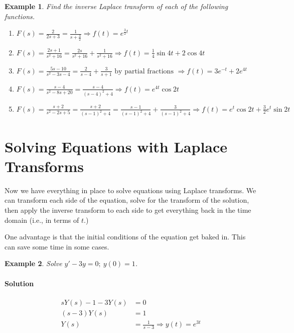 \documentclass[letterpaper, 11pt, openany]{book}
\theoremstyle{mytheoremstyle}
\theoremstyle{myexamplestyle}
\newtheorem{example}{Example}[section]
\newenvironment{solution}{\paragraph{\sffamily \smaller \fontseries{b}\selectfont Solution}}{\hfill\faSquare}
\begin{document}
\begin{example}\label{e:de-inv-laplace}
    Find the inverse Laplace transform of each of the following functions.
    \begin{enumerate}
        \item \(\displaystyle F(s) = \frac{2}{2s + 3} = \frac{1}{s + \frac{3}{2}} \Rightarrow f(t) = e^{\frac{3}{2}t}\)
        \item \(\displaystyle F(s) = \frac{2s + 1}{s^2 + 16} = \frac{2s}{s^2 + 16} + \frac{1}{s^2 + 16} \Rightarrow f(t) = \frac{1}{4} \sin 4t + 2 \cos 4t\)
        \item \(\displaystyle F(s) = \frac{5s - 10}{s^2 - 3s - 4} = \frac{2}{s-4} + \frac{3}{s+1} \text{ by partial fractions }\Rightarrow f(t) = 3e^{-t} + 2e^{4t}\)
        \item \(\displaystyle F(s) = \frac{s-4}{s^2 - 8s + 20} = \frac{s-4}{(s-4)^2 + 4} \Rightarrow f(t) = e^{4t} \cos 2t\)
        \item \(\displaystyle F(s) = \frac{s + 2}{s^{2} - 2s + 5} = \frac{s + 2}{(s-1)^2 + 4} = \frac{s-1}{(s-1)^2 + 4} + \frac{3}{(s-1)^2 + 4} \Rightarrow f(t) = e^t \cos 2t + \frac{3}{2} e^t \sin 2t\)
    \end{enumerate}
\end{example}

\section{Solving Equations with Laplace Transforms}
\setcounter{figure}{0}
Now we have everything in place to solve equations using Laplace transforms. We can transform each side of the equation, solve for the transform of the solution, then apply the inverse transform to each side to get everything back in the time domain (i.e., in terms of \(t\).)

One advantage is that the initial conditions of the equation get baked in. This can save some time in some cases.

\begin{example}
    Solve \(y' - 3y = 0; \ y(0) = 1\).
    \begin{solution}
        \begin{align*}
            sY(s) - 1 - 3Y(s) &= 0\\
                (s-3)Y(s) &= 1\\
                Y(s) &= \frac{1}{s-3} \Rightarrow y(t) = e^{3t}
        \end{align*}
    \end{solution}
\end{example}
\end{document}
